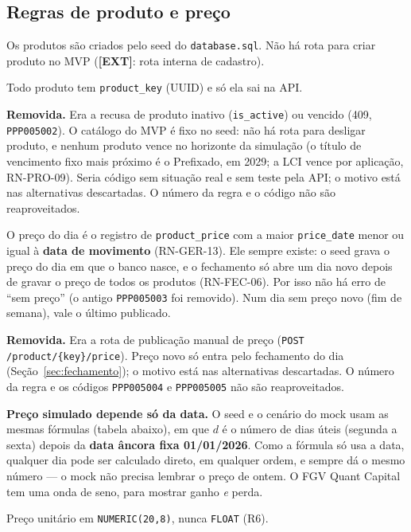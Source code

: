 \documentclass[11pt,a4paper]{article}
\newcommand{\fundo}{FGV Quant Capital}     %
\newcommand{\obr}{\textbf{[OBR]}}          %
\newcommand{\dec}{\textbf{[DEC]}}          %
\newcommand{\ext}{\textbf{[EXT]}}          %
\newcommand{\tb}[1]{\texttt{#1}}           %
\begin{document}
\subsection{Regras de produto e preço}

\begin{regras}
  \item[RN-PRO-01 \dec] Os produtos são criados pelo seed do \tb{database.sql}. Não há rota para
  criar produto no MVP (\ext: rota interna de cadastro).
  \item[RN-PRO-02 \obr] Todo produto tem \tb{product_key} (UUID) e só ela sai na API.
  \item[RN-PRO-03 \dec] \textbf{Removida.} Era a recusa de produto inativo (\tb{is_active}) ou
  vencido (409, \tb{PPP005002}). O catálogo do MVP é fixo no seed: não há rota para desligar
  produto, e nenhum produto vence no horizonte da simulação (o título de vencimento fixo mais
  próximo é o Prefixado, em 2029; a LCI vence por aplicação, RN-PRO-09). Seria código sem
  situação real e sem teste pela API; o motivo está nas alternativas descartadas. O número da
  regra e o código não são reaproveitados.
  \item[RN-PRO-04 \dec] O preço do dia é o registro de \tb{product_price} com a maior
  \tb{price_date} menor ou igual à \textbf{data de movimento} (RN-GER-13). Ele sempre existe:
  o seed grava o preço do dia em que o banco nasce, e o fechamento só abre um dia novo depois de
  gravar o preço de todos os produtos (RN-FEC-06). Por isso não há erro de ``sem preço'' (o antigo
  \tb{PPP005003} foi removido). Num dia sem preço novo (fim de semana), vale o último publicado.
  \item[RN-PRO-05 \dec] \textbf{Removida.} Era a rota de publicação manual de preço
  (\tb{POST /product/\{key\}/price}). Preço novo só entra pelo fechamento do dia
  (Seção~\ref{sec:fechamento}); o motivo está nas alternativas descartadas. O número da regra e os
  códigos \tb{PPP005004} e \tb{PPP005005} não são reaproveitados.
  \item[RN-PRO-06 \dec] \textbf{Preço simulado depende só da data.} O seed e o cenário do mock usam
  as mesmas fórmulas (tabela abaixo), em que $d$ é o número de dias úteis (segunda a sexta) depois
  da \textbf{data âncora fixa 01/01/2026}. Como a fórmula só usa a data, qualquer dia pode ser
  calculado direto, em qualquer ordem, e sempre dá o mesmo número --- o mock não precisa lembrar o
  preço de ontem. O \fundo{} tem uma onda de seno, para mostrar ganho \emph{e} perda.
  \item[RN-PRO-07 \obr] Preço unitário em \tb{NUMERIC(20,8)}, nunca \tb{FLOAT} (R6).

\end{regras}
\end{document}
